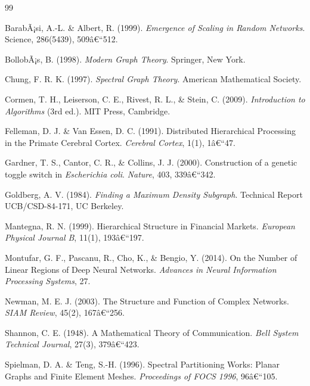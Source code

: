 ﻿\documentclass[12pt,a4paper,twoside]{article}
\theoremstyle{definition}
\theoremstyle{plain}
\theoremstyle{remark}
\begin{document}
\begin{thebibliography}{99}

  BarabÃ¡si, A.-L. \& Albert, R. (1999).
  \textit{Emergence of Scaling in Random Networks}.
  Science, 286(5439), 509â€“512.

  BollobÃ¡s, B. (1998).
  \textit{Modern Graph Theory}.
  Springer, New York.

  Chung, F. R. K. (1997).
  \textit{Spectral Graph Theory}.
  American Mathematical Society.

  Cormen, T. H., Leiserson, C. E., Rivest, R. L., \& Stein, C. (2009).
  \textit{Introduction to Algorithms} (3rd ed.).
  MIT Press, Cambridge.

  Felleman, D. J. \& Van Essen, D. C. (1991).
  Distributed Hierarchical Processing in the Primate Cerebral Cortex.
  \textit{Cerebral Cortex}, 1(1), 1â€“47.

  Gardner, T. S., Cantor, C. R., \& Collins, J. J. (2000).
  Construction of a genetic toggle switch in \textit{Escherichia coli}.
  \textit{Nature}, 403, 339â€“342.

  Goldberg, A. V. (1984).
  \textit{Finding a Maximum Density Subgraph}.
  Technical Report UCB/CSD-84-171, UC Berkeley.

  Mantegna, R. N. (1999).
  Hierarchical Structure in Financial Markets.
  \textit{European Physical Journal B}, 11(1), 193â€“197.

  Montufar, G. F., Pascanu, R., Cho, K., \& Bengio, Y. (2014).
  On the Number of Linear Regions of Deep Neural Networks.
  \textit{Advances in Neural Information Processing Systems}, 27.

  Newman, M. E. J. (2003).
  The Structure and Function of Complex Networks.
  \textit{SIAM Review}, 45(2), 167â€“256.

  Shannon, C. E. (1948).
  A Mathematical Theory of Communication.
  \textit{Bell System Technical Journal}, 27(3), 379â€“423.

  Spielman, D. A. \& Teng, S.-H. (1996).
  Spectral Partitioning Works: Planar Graphs and Finite Element Meshes.
  \textit{Proceedings of FOCS 1996}, 96â€“105.


\end{thebibliography}
\end{document}
